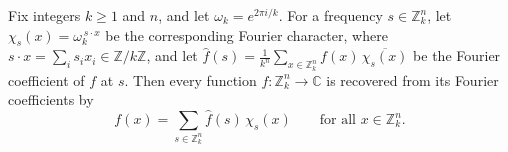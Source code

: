 \begin{lemma}
\label{ZkFourier.fourier_expansion}
\leanok
{}
Fix integers $k \ge 1$ and $n$, and let $\omega_k = e^{2\pi i/k}$. For a frequency $s
\in \mathbb{Z}_k^n$, let $\chi_s(x) = \omega_k^{\,s\cdot x}$ be the corresponding
Fourier character, where $s\cdot x = \sum_{i} s_i x_i \in \mathbb{Z}/k\mathbb{Z}$, and
let $\hat f(s) = \tfrac{1}{k^n}\sum_{x \in \mathbb{Z}_k^n} f(x)\,\overline{\chi_s(x)}$
be the Fourier coefficient of $f$ at $s$. Then every function $f : \mathbb{Z}_k^n \to
\mathbb{C}$ is recovered from its Fourier coefficients by
\[
  f(x) = \sum_{s \in \mathbb{Z}_k^n} \hat f(s)\,\chi_s(x)
  \qquad\text{for all } x \in \mathbb{Z}_k^n.
\]
\end{lemma}

